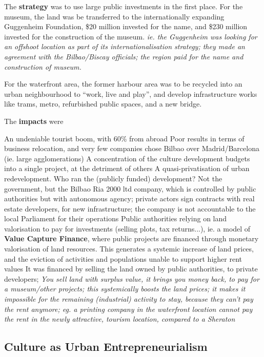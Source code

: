 \documentclass{article}
\begin{document}
The \textbf{strategy} was to use large public investments in the first place. For the museum, the land was be transferred to the internationally expanding Guggenheim Foundation, \$20 million invested for the name, and \$230 million invested for the construction of the museum. \textit{ie. the Guggenheim was looking for an offshoot location as part of its internationalisation strategy; they made an agreement with the Bilbao/Biscay officials; the region paid for the name and construction of museum.}

For the waterfront area, the former harbour area was to be recycled into an urban neighbourhood to ``work, live and play'', and develop infrastructure works like trams, metro, refurbished public spaces, and a new bridge.

The \textbf{impacts} were

\begin{outline}
	\1 An undeniable tourist boom, with 60\% from abroad
	\1 Poor results in terms of business relocation, and very few companies chose Bilbao over Madrid/Barcelona (ie. large agglomerations)
	\1 A concentration of the culture development budgets into a single project, at the detriment of others
	\1 A quasi-privatisation of urban redevelopment. Who ran the (publicly funded) development? Not the government, but the Bilbao Ria 2000 ltd company, which is controlled by public authorities but with autonomous agency; private actors sign contracts with real estate developers, for new infrastructure; the company is not accountable to the local Parliament for their operations
	\1 Public authorities relying on land valorisation to pay for investments (selling plots, tax returns...), ie. a model of \textbf{Value Capture Finance}, where public projects are financed through monetary valorisation of land resources. This generates a systemic increase of land prices, and the eviction of activities and populations unable to support higher rent values
		\2 It was financed by selling the land owned by public authorities, to private developers; \textit{You sell land with surplus value, it brings you money back, to pay for a museum/other projects; this systemically boosts the land prices; it makes it impossible for the remaining (industrial) activity to stay, because they can't pay the rent anymore; eg. a printing company in the waterfront location cannot pay the rent in the newly attractive, tourism location, compared to a Sheraton}
\end{outline}

\subsection{Culture as Urban Entrepreneurialism}
\end{document}
